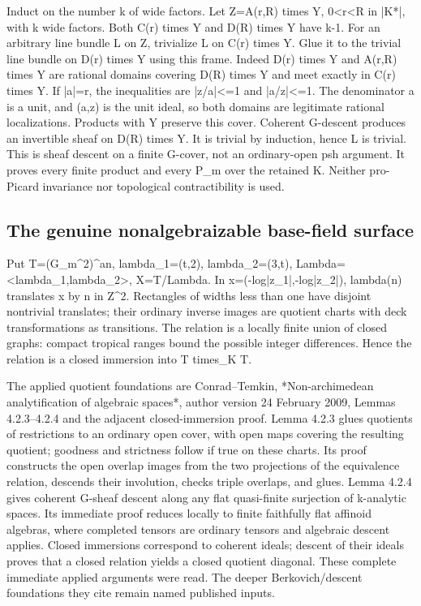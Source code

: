 \documentclass[11pt]{article}
\begin{document}
Induct on the number k of wide factors. Let Z=A(r,R) times Y, 0<r<R in |K*|, with k wide factors. Both C(r) times Y and D(R) times Y have k-1. For an arbitrary line bundle L on Z, trivialize L on C(r) times Y. Glue it to the trivial line bundle on D(r) times Y using this frame. Indeed D(r) times Y and A(r,R) times Y are rational domains covering D(R) times Y and meet exactly in C(r) times Y. If |a|=r, the inequalities are |z/a|<=1 and |a/z|<=1. The denominator a is a unit, and (a,z) is the unit ideal, so both domains are legitimate rational localizations. Products with Y preserve this cover. Coherent G-descent produces an invertible sheaf on D(R) times Y. It is trivial by induction, hence L is trivial. This is sheaf descent on a finite G-cover, not an ordinary-open psh argument. It proves every finite product and every P\_m over the retained K. Neither pro-Picard invariance nor topological contractibility is used.

\subsection*{The genuine nonalgebraizable base-field surface}

Put T=(G\_m\textasciicircum{}2)\textasciicircum{}an, lambda\_1=(t,2), lambda\_2=(3,t), Lambda=<lambda\_1,lambda\_2>, X=T/Lambda. In x=(-log|z\_1|,-log|z\_2|), lambda(n) translates x by n in Z\textasciicircum{}2. Rectangles of widths less than one have disjoint nontrivial translates; their ordinary inverse images are quotient charts with deck transformations as transitions. The relation is a locally finite union of closed graphs: compact tropical ranges bound the possible integer differences. Hence the relation is a closed immersion into T times\_K T.

The applied quotient foundations are Conrad--Temkin, *Non-archimedean analytification of algebraic spaces*, author version 24 February 2009, Lemmas 4.2.3--4.2.4 and the adjacent closed-immersion proof. Lemma 4.2.3 glues quotients of restrictions to an ordinary open cover, with open maps covering the resulting quotient; goodness and strictness follow if true on these charts. Its proof constructs the open overlap images from the two projections of the equivalence relation, descends their involution, checks triple overlaps, and glues. Lemma 4.2.4 gives coherent G-sheaf descent along any flat quasi-finite surjection of k-analytic spaces. Its immediate proof reduces locally to finite faithfully flat affinoid algebras, where completed tensors are ordinary tensors and algebraic descent applies. Closed immersions correspond to coherent ideals; descent of their ideals proves that a closed relation yields a closed quotient diagonal. These complete immediate applied arguments were read. The deeper Berkovich/descent foundations they cite remain named published inputs.
\end{document}
